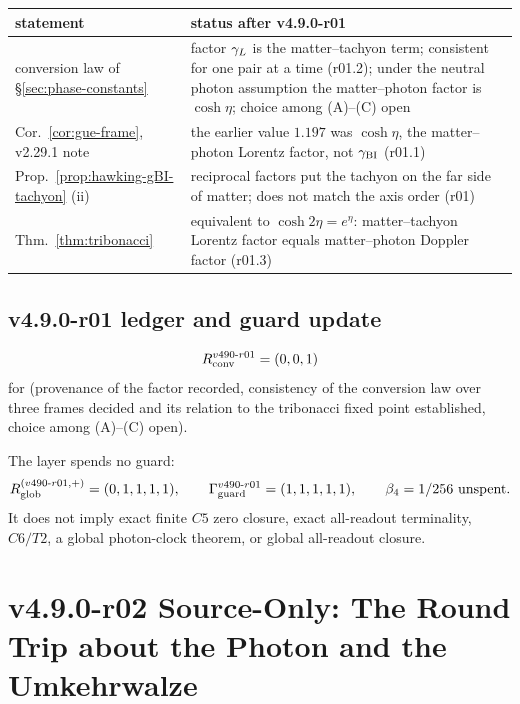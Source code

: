 \begin{center}
\small
\begin{tabular}{@{}>{\raggedright\arraybackslash}p{}>{\raggedright\arraybackslash}p{}@{}}
\toprule
statement & status after v4.9.0-r01\\
\midrule
conversion law of \S\ref{sec:phase-constants} & factor \(\gamma_L\) is the matter--tachyon term; consistent for one pair at a time (r01.2); under the neutral photon assumption the matter--photon factor is \(\cosh\eta\); choice among (A)--(C) open\\
Cor.~\ref{cor:gue-frame}, v2.29.1 note & the earlier value \(1.197\) was \(\cosh\eta\), the matter--photon Lorentz factor, not \(\gamma_{\mathrm{BI}}\) (r01.1)\\
Prop.~\ref{prop:hawking-gBI-tachyon} (ii) & reciprocal factors put the tachyon on the far side of matter; does not match the axis order (r01)\\
Thm.~\ref{thm:tribonacci} & equivalent to \(\cosh2\eta=e^{\eta}\): matter--tachyon Lorentz factor equals matter--photon Doppler factor (r01.3)\\
\bottomrule
\end{tabular}
\end{center}

\subsection*{v4.9.0-r01 ledger and guard update}
\label{subsec:v490-r01-ledger-guard}

\[
R_{\rm conv}^{v490\text{-}r01}=(0,0,1)
\]
for (provenance of the factor recorded, consistency of the conversion law over three frames decided and its relation to
the tribonacci fixed point established, choice among (A)--(C) open).

The layer spends no guard:
\[
R_{\rm glob}^{(v490\text{-}r01,+)}=(0,1,1,1,1),
\qquad
\Gamma_{\rm guard}^{v490\text{-}r01}=(1,1,1,1,1),
\qquad
\beta_4=1/256\ \text{unspent}.
\]
It does not imply exact finite \(C5\) zero closure, exact all-readout terminality,
\(C6/T2\), a global photon-clock theorem, or global all-readout closure.

\clearpage
\section*{v4.9.0-r02 Source-Only: The Round Trip about the Photon and the Umkehrwalze}
\label{sec:v490-r02-round-trip-umkehrwalze}

